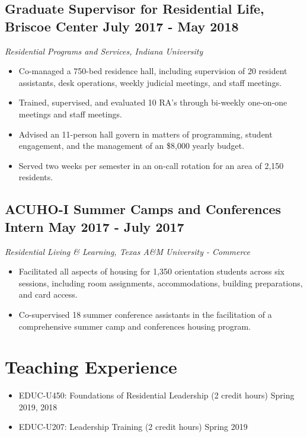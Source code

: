 \documentclass{article}
\begin{document}
\subsection*{Graduate Supervisor for Residential Life, Briscoe Center  \hfill
  \textnormal{July 2017 - May 2018}}
\textit{Residential Programs and Services, Indiana University}
\begin{itemize}
\item Co-managed a 750-bed residence hall, including supervision of 20 resident
  assistants, desk operations, weekly judicial meetings, and staff meetings.
\item Trained, supervised, and evaluated 10 RA's through bi-weekly one-on-one
  meetings and staff meetings.
\item Advised an 11-person hall govern in matters of programming, student
  engagement, and the management of an \$8,000 yearly budget.
\item Served two weeks per semester in an on-call rotation for an area of 2,150 residents.
 \end{itemize}

\subsection*{ACUHO-I Summer Camps and Conferences Intern  \hfill
  \textnormal{May 2017 - July 2017}}
\textit{Residential Living \& Learning, Texas A\&M University - Commerce}
\begin{itemize}
\item Facilitated all aspects of housing for 1,350 orientation students across
  six sessions, including room assignments, accommodations, building
  preparations, and card access.
\item Co-supervised 18 summer conference assistants in the facilitation of a
  comprehensive summer camp and conferences housing program.
\end{itemize}

\section*{Teaching Experience\hrulefill}
\begin{itemize}
\item {EDUC-U450: Foundations of Residential Leadership (2
 credit hours) \hfill Spring 2019, 2018}
\item {EDUC-U207: Leadership Training (2 credit hours) \hfill Spring 2019}
\end{itemize}
\end{document}

